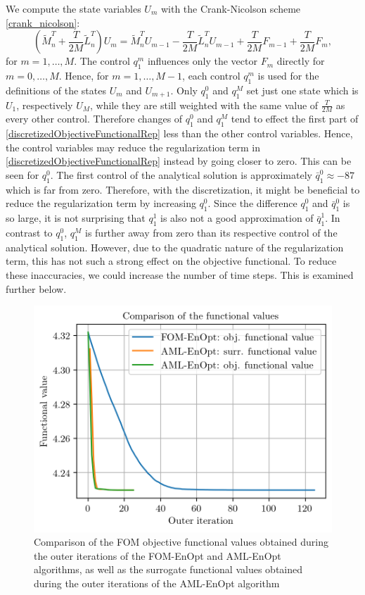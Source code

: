 We compute the state variables $U_m$ with the Crank-Nicolson scheme \eqref{crank_nicolson}:
\begin{equation*}
\left(\tilde{M}_n^T + \frac{T}{2M} \tilde{L}_n^T\right) U_m = \tilde{M}_n^TU_{m-1} - \frac{T}{2M} \tilde{L}_n^T U_{m-1} + \frac{T}{2M} F_{m-1} + \frac{T}{2M} F_m,
\end{equation*}
for $m=1,\dotsc,M$. The control $q^m_1$ influences only the vector $F_m$ directly for $m=0,\dotsc,M$. Hence, for $m=1,\dotsc,M-1$, each control $q^m_1$ is used for the definitions of the states $U_m$ and $U_{m+1}$. Only $q^0_1$ and $q^M_1$ set just one state which is $U_1$, respectively $U_M$, while they are still weighted with the same value of $\frac{T}{2M}$ as every other control. Therefore changes of $q^0_1$ and $q^M_1$ tend to effect the first part of \eqref{discretizedObjectiveFunctionalRep} less than the other control variables. Hence, the control variables may reduce the regularization term in \eqref{discretizedObjectiveFunctionalRep} instead by going closer to zero. This can be seen for $q^0_1$. The first control of the analytical solution is approximately $\bar{q}^0_1\approx-87$ which is far from zero. Therefore, with the discretization, it might be beneficial to reduce the regularization term by increasing $q^0_1$. Since the difference $q^0_1$ and $\bar{q}^0_1$ is so large, it is not surprising that $q^1_1$ is also not a good approximation of $\bar{q}^1_1$. In contrast to $q^0_1$, $q^M_1$ is further away from zero than its respective control of the analytical solution. However, due to the quadratic nature of the regularization term, this has not such a strong effect on the objective functional. To reduce these inaccuracies, we could increase the number of time steps. This is examined further below.\\

\begin{figure}
\centering
\includegraphics{Plots/functionalValueComp.png}
\caption{\label{FOMAMLEnOptFuncValComp}Comparison of the FOM objective functional values obtained during the outer iterations of the FOM-EnOpt and AML-EnOpt algorithms, as well as the surrogate functional values obtained during the outer iterations of the AML-EnOpt algorithm}
\end{figure}

